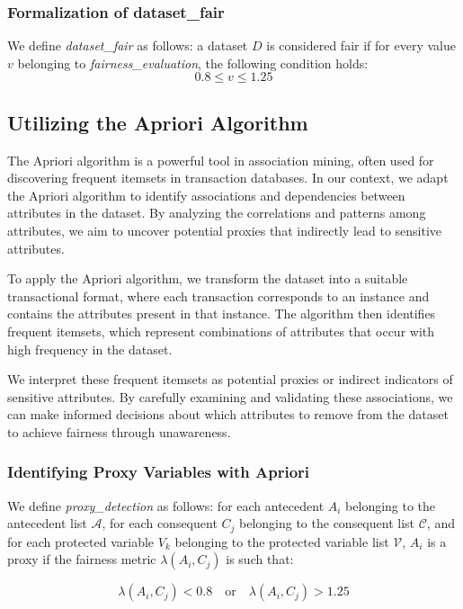 \documentclass[12pt,a4paper,openright,twoside]{book}
\begin{document}
\subsubsection{Formalization of dataset\_fair}
We define \textit{dataset\_fair} as follows: a dataset \( D \) is considered fair if for every value \( v \) belonging to \textit{fairness\_evaluation}, the following condition holds:
\[ 0.8 \leq v \leq 1.25 \]

\subsection{Utilizing the Apriori Algorithm}
The Apriori algorithm is a powerful tool in association mining, often used for discovering frequent itemsets in transaction databases. In our context, we adapt the Apriori algorithm to identify associations and dependencies between attributes in the dataset. By analyzing the correlations and patterns among attributes, we aim to uncover potential proxies that indirectly lead to sensitive attributes.

To apply the Apriori algorithm, we transform the dataset into a suitable transactional format, where each transaction corresponds to an instance and contains the attributes present in that instance. The algorithm then identifies frequent itemsets, which represent combinations of attributes that occur with high frequency in the dataset.

We interpret these frequent itemsets as potential proxies or indirect indicators of sensitive attributes. By carefully examining and validating these associations, we can make informed decisions about which attributes to remove from the dataset to achieve fairness through unawareness.

\subsubsection{Identifying Proxy Variables with Apriori}

We define \textit{proxy\_detection} as follows: for each antecedent \( A_i \) belonging to the antecedent list \( \mathcal{A} \), for each consequent \( C_j \) belonging to the consequent list \( \mathcal{C} \), and for each protected variable \( V_k \) belonging to the protected variable list \( \mathcal{V} \), \( A_i \) is a proxy if the fairness metric \( \lambda(A_i, C_j) \) is such that:

\[\lambda(A_i, C_j) < 0.8 \quad \text{or} \quad \lambda(A_i, C_j) > 1.25\]
\end{document}
